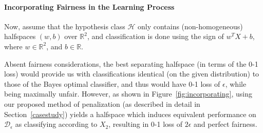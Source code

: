 \paragraph{Incorporating Fairness in the Learning Process}
Now, assume that the hypothesis class $\mathcal{H}$ only contains (non-homogeneous) halfspaces $(w,b)$ over $\mathbb{R}^2$, and classification is done using the sign of $w^{T}X + b$, where $w \in \mathbb{R}^2$, and $b \in \mathbb{R}$.

Absent fairness considerations, the best separating halfspace (in terms of the 0-1 loss) would provide us with classifications identical (on the given distribution) to those of the Bayes optimal classifier, and thus would have 0-1 loss of $\epsilon$, while being maximally unfair. However, as shown in Figure~\ref{fig:incorporating}, using our proposed method of penalization (as described in detail in Section~\ref{casestudy}) yields a halfspace which induces equivalent performance on $\mathcal{D}_{\epsilon}$ as classifying according to $X_2$, resulting in 0-1 loss of $2\epsilon$ and perfect fairness.
